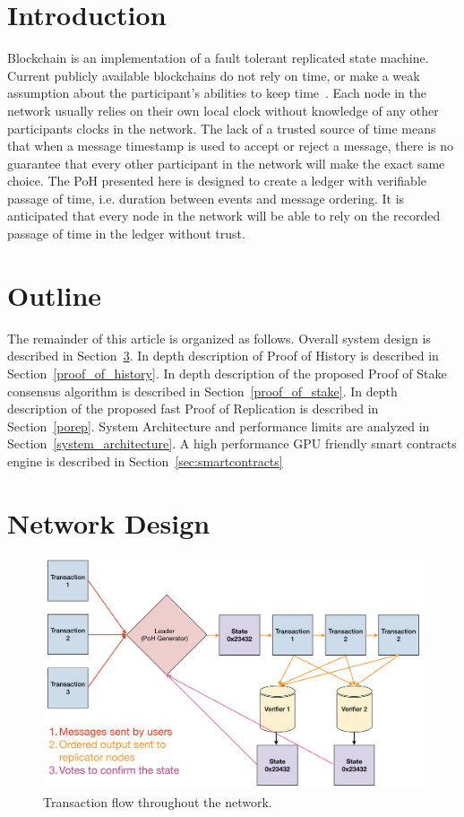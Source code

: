 \documentclass[12pt]{article}
\begin{document}
\section{Introduction}\normalsize
Blockchain is an implementation of a fault tolerant replicated state machine. Current publicly available blockchains do not rely on time, or make a weak assumption about the participant’s abilities to keep time~\cite{tendermint,hashgraph}. Each node in the network usually relies on their own local clock without knowledge of any other participants clocks in the network. The lack of a trusted source of time means that when a message timestamp is used to accept or reject a message, there is no guarantee that every other participant in the network will make the exact same choice. The PoH presented here is designed to create a ledger with verifiable passage of time, i.e. duration between events and message ordering. It is anticipated that every node in the network will be able to rely on the recorded passage of time in the ledger without trust.

\section{Outline}
The remainder of this article is organized as follows. Overall system design is described in Section~\ref{design}. In depth description of Proof of History is described in Section~\ref{proof_of_history}. In depth description of the proposed Proof of Stake consensus algorithm is described in Section~\ref{proof_of_stake}. In depth description of the proposed fast Proof of Replication is described in Section~\ref{porep}. System Architecture and performance limits are analyzed in Section~\ref{system_architecture}. A high performance GPU friendly smart contracts engine is described in Section~\ref{sec:smartcontracts}

\section{Network Design}\label{design}

\begin{figure}[h]
  \begin{center}
    \centering
    \includegraphics[width=\textwidth]{figures/network_design_001.png}
    \caption[Fig 1]{Transaction flow throughout the network.\label{fig:design}}
  \end{center}
  \end{figure}
\end{document}
